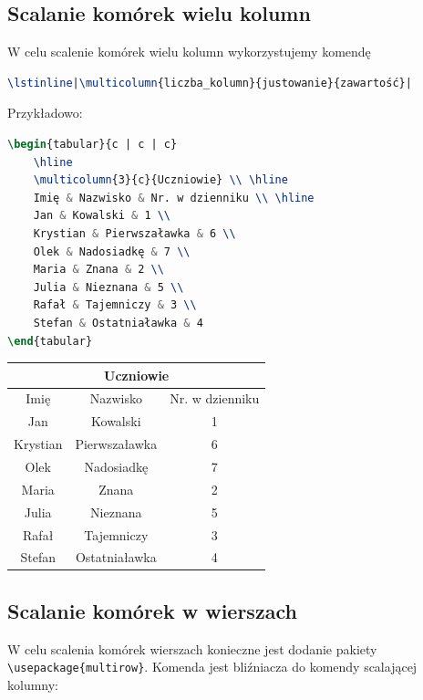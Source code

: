 \documentclass[10pt,a4paper]{article}
\begin{document}
\subsection{Scalanie komórek wielu kolumn}

W celu scalenie komórek wielu kolumn wykorzystujemy komendę

\begin{lstlisting}[language=TeX]
\lstinline|\multicolumn{liczba_kolumn}{justowanie}{zawartość}|
\end{lstlisting}

Przykładowo:

\begin{lstlisting}[language=TeX]
\begin{tabular}{c | c | c}
	\hline
	\multicolumn{3}{c}{Uczniowie} \\ \hline
	Imię & Nazwisko & Nr. w dzienniku \\ \hline
	Jan & Kowalski & 1 \\
	Krystian & Pierwszaławka & 6 \\
	Olek & Nadosiadkę & 7 \\
	Maria & Znana & 2 \\
	Julia & Nieznana & 5 \\
	Rafał & Tajemniczy & 3 \\
	Stefan & Ostatniaławka & 4
\end{tabular}
\end{lstlisting}

\begin{tabular}{c | c | c}
	\hline
	\multicolumn{3}{c}{Uczniowie} \\ \hline
	Imię & Nazwisko & Nr. w dzienniku \\ \hline
	Jan & Kowalski & 1 \\
	Krystian & Pierwszaławka & 6 \\
	Olek & Nadosiadkę & 7 \\
	Maria & Znana & 2 \\
	Julia & Nieznana & 5 \\
	Rafał & Tajemniczy & 3 \\
	Stefan & Ostatniaławka & 4
\end{tabular}

\subsection{Scalanie komórek w wierszach}

W celu scalenia komórek wierszach konieczne jest dodanie pakiety \lstinline|\usepackage{multirow}|. Komenda jest bliźniacza do komendy scalającej kolumny:
\end{document}
